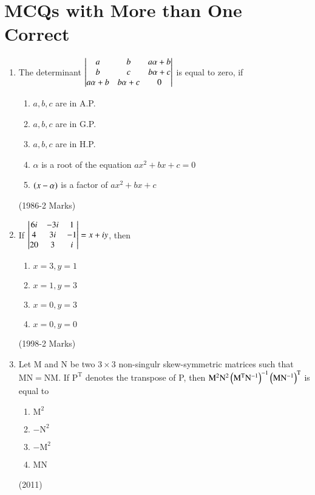 \documentclass[journal,12pt,twocolumn]{IEEEtran}
\theoremstyle{remark}
\begin{document}
		\section{MCQs with More than One Correct}
			\begin{enumerate}[label=\arabic*)]
				\item
					The determinant $
							\begin{vmatrix}
								a & b & a \alpha + b\\
								b & c & b \alpha + c\\
								a \alpha + b & b \alpha + c & 0
							\end{vmatrix}
					$ is equal to zero, if
						\begin{enumerate}[label=(\alph*)]
									\item $a,b,c$ are in A.P.
									\item $a,b,c$ are in G.P.
									\item $a,b,c$ are in H.P.
									\item $\alpha$ is a root of the equation $ax^2 + bx +c=0$
									\item $\left(x-\alpha\right)$ is a factor of $ax^2 + bx +c$
						\end{enumerate}
						\hfill (1986-2 Marks)\\
				\item 
					If $
					\begin{vmatrix}
						6i & -3i & 1\\
						4 & 3i & -1\\
						20 & 3 & i
					\end{vmatrix} = x +iy$, then 
					\begin{enumerate}[label=(\alph*)]
						\item $x=3,y=1$
						\item $x=1,y=3$
						\item $x=0,y=3$
						\item $x=0,y=0$
					\end{enumerate}
					\hfill (1998-2 Marks)\\
				\item 
					Let M and N be two $3 \times 3$ non-singulr skew-symmetric matrices such that $\mathrm{MN=NM}$. If $\mathrm{P^T}$ denotes the transpose of P, then $\mathrm{M^2N^2\left(M^TN^{-1}\right)^{-1} \left(MN^{-1}\right)^T}$ is equal to 
					\begin{enumerate}[label=(\alph*)]
						\item $\mathrm{M^2}$
						\item $-\mathrm{N^2}$
						\item $-\mathrm{M^2}$
						\item MN
					\end{enumerate}
					\hfill (2011)\\

\end{enumerate}
\end{document}
